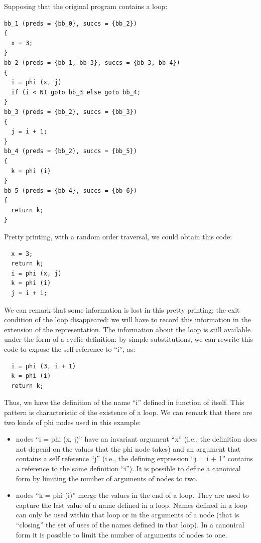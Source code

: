 Supposing that the original program contains a loop:
\begin{verbatim}
bb_1 (preds = {bb_0}, succs = {bb_2})
{
  x = 3;
}
bb_2 (preds = {bb_1, bb_3}, succs = {bb_3, bb_4})
{
  i = phi (x, j)
  if (i < N) goto bb_3 else goto bb_4;
}
bb_3 (preds = {bb_2}, succs = {bb_3})
{
  j = i + 1;
}
bb_4 (preds = {bb_2}, succs = {bb_5})
{
  k = phi (i)
}
bb_5 (preds = {bb_4}, succs = {bb_6})
{
  return k;
}
\end{verbatim}
Pretty printing, with a random order traversal, we could obtain this
\SSA{} code:
\begin{verbatim}
  x = 3;
  return k;
  i = phi (x, j)
  k = phi (i)
  j = i + 1;
\end{verbatim}
We can remark that some information is lost in this pretty printing:
the exit condition of the loop disappeared: we will have to record
this information in the extension of the \SSA{} representation.  The
information about the loop is still available under the form
of a cyclic definition: by simple substitutions, we can rewrite this
\SSA{} code to expose the self reference to ``i'', as:
\begin{verbatim}
  i = phi (3, i + 1)
  k = phi (i)
  return k;
\end{verbatim}
Thus, we have the definition of the \SSA{} name ``i'' defined in
function of itself.  This pattern is characteristic of the existence
of a loop.  We can remark that there are two kinds of phi
nodes used in this example:
\begin{itemize}
\item \loopphi{} nodes ``i = phi (x, j)'' have an invariant argument
  ``x'' (i.e., the definition does not depend on the values that the
  phi node takes) and an argument that contains a self reference ``j''
  (i.e., the defining expression ``j = i + 1'' contains a reference to
  the same \loopphi{} definition ``i'').  It is possible to define a
  canonical \SSA{} form by limiting the number of arguments of
  \loopphi{} nodes to two.
\item \closephi{} nodes ``k = phi (i)'' merge the values in the end of
  a loop.  They are used to capture the last value of a name defined
  in a loop.  Names defined in a loop can only be used within that
  loop or in the arguments of a \closephi{} node (that is ``closing''
  the set of uses of the names defined in that loop).  In a canonical
  \SSA{} form it is possible to limit the number of arguments of
  \closephi{} nodes to one.
\end{itemize}

